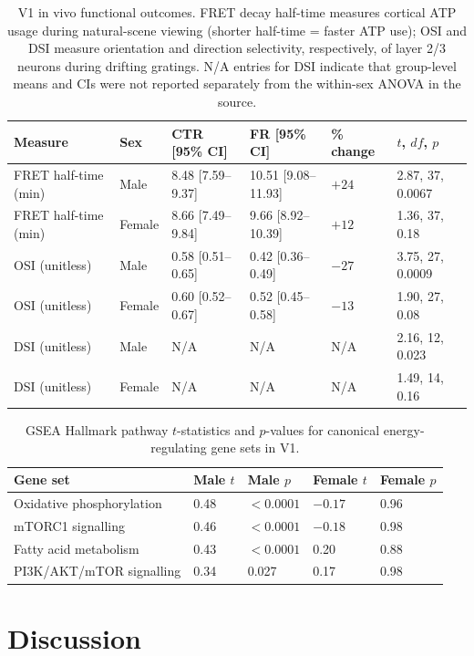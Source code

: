 \documentclass[11pt]{article}
\begin{document}
\begin{table}[htbp]
\centering
\caption{V1 in vivo functional outcomes. FRET decay half-time measures cortical ATP usage during natural-scene viewing (shorter half-time = faster ATP use); OSI and DSI measure orientation and direction selectivity, respectively, of layer 2/3 neurons during drifting gratings. N/A entries for DSI indicate that group-level means and CIs were not reported separately from the within-sex ANOVA in the source.}
\label{tab:functional}
\begin{tabular}{llllll}
\toprule
Measure & Sex & CTR [95\% CI] & FR [95\% CI] & \% change & $t$, $df$, $p$ \\
\midrule
FRET half-time (min) & Male & 8.48 [7.59--9.37] & 10.51 [9.08--11.93] & $+24$ & 2.87, 37, 0.0067 \\
FRET half-time (min) & Female & 8.66 [7.49--9.84] & 9.66 [8.92--10.39] & $+12$ & 1.36, 37, 0.18 \\
OSI (unitless) & Male & 0.58 [0.51--0.65] & 0.42 [0.36--0.49] & $-27$ & 3.75, 27, 0.0009 \\
OSI (unitless) & Female & 0.60 [0.52--0.67] & 0.52 [0.45--0.58] & $-13$ & 1.90, 27, 0.08 \\
DSI (unitless) & Male & N/A & N/A & N/A & 2.16, 12, 0.023 \\
DSI (unitless) & Female & N/A & N/A & N/A & 1.49, 14, 0.16 \\
\bottomrule
\end{tabular}
\end{table}

\begin{table}[htbp]
\centering
\caption{GSEA Hallmark pathway $t$-statistics and $p$-values for canonical energy-regulating gene sets in V1.}
\label{tab:gsea}
\begin{tabular}{lllll}
\toprule
Gene set & Male $t$ & Male $p$ & Female $t$ & Female $p$ \\
\midrule
Oxidative phosphorylation & 0.48 & $<0.0001$ & $-0.17$ & 0.96 \\
mTORC1 signalling & 0.46 & $<0.0001$ & $-0.18$ & 0.98 \\
Fatty acid metabolism & 0.43 & $<0.0001$ & 0.20 & 0.88 \\
PI3K/AKT/mTOR signalling & 0.34 & 0.027 & 0.17 & 0.98 \\
\bottomrule
\end{tabular}
\end{table}

\section{Discussion}
\end{document}

